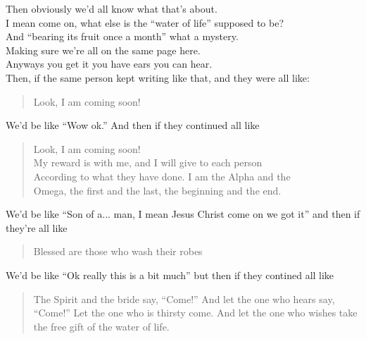 {{                %
                \begin{together}
                Then obviously we'd all know what that's about.\\
                I mean come on, what else is the ``water of life'' supposed to be?\\
                And ``bearing its fruit once a month'' what a mystery.\\
                Making sure we're all on the same page here.\\
                Anyways you get it you have ears you can hear.\\
                Then, if the same person kept writing like that, and they were all like:
                \end{together}

                \begin{quote}
                Look, I am coming soon!
                \end{quote}

                We'd be like ``Wow ok.'' And then if they continued all like

                \begin{quote}
                Look, I am coming soon!\\
                My reward is with me, and I will give to each person\\
                According to what they have done. I am the Alpha and the\\
                Omega, the first and the last, the beginning and the end.
                \end{quote}

                We'd be like ``Son of a... man, I mean Jesus Christ come on we got it'' and then if they're all like

                \begin{quote}
                Blessed are those who wash their robes
                \end{quote}

                We'd be like ``Ok really this is a bit much'' but then if they contined all like

                \begin{quote}
                The Spirit and the bride say, ``Come!'' And let the one who hears say, ``Come!''
                Let the one who is thirsty come.
                And let the one who wishes take the free gift of the water of life.
                \end{quote}

}}
